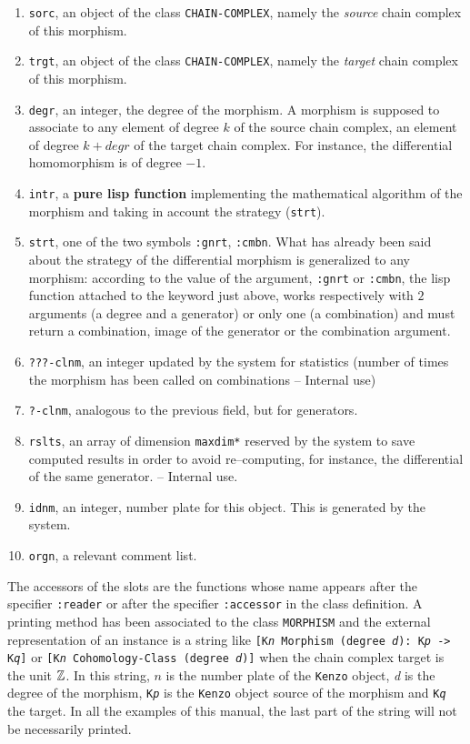 \begin{enumerate}
\item {\tt sorc}, an object of the class {\tt CHAIN-COMPLEX}, namely the {\em source} chain complex
of this morphism.
\item {\tt trgt}, an object of the class {\tt CHAIN-COMPLEX}, namely the {\em target} chain complex of this morphism.
\item {\tt degr}, an integer, the degree of the morphism. A morphism is supposed to associate
to any element of degree $k$ of the source chain complex, an element of degree $k + degr$ of the
target chain complex. For instance, the differential homomorphism is of degree $-1$.
\item {\tt intr}, a {\bf pure lisp function} implementing the mathematical algorithm of the morphism and
taking in account the strategy ({\tt strt}).
\item {\tt strt}, one of the two symbols {\tt :gnrt}, {\tt :cmbn}. What has already been  said about
the strategy of the differential morphism is generalized to any morphism: according 
to the value of the argument, {\tt :gnrt} or {\tt :cmbn}, the lisp function attached to the keyword just above, 
works respectively with $2$ arguments (a degree and a generator) or
only one (a combination) and must return a combination, image of the generator or the combination argument.
\item {\tt ???-clnm}, an integer updated by the system for statistics (number of times the
morphism has been called on combinations -- Internal use)
\item {\tt ?-clnm}, analogous to the previous field, but for generators.
\item {\tt rslts}, an array of dimension {\tt *maxdim*} reserved by the system to save  computed
results in order to avoid  re--computing, for instance, the differential of the same
generator. -- Internal use.
\item {\tt idnm}, an integer, number plate for this object. This is generated by
the system.
\item {\tt orgn}, a relevant comment list.
\end{enumerate}
The accessors of the slots are the functions whose name appears after the specifier {\tt :reader}
or after the specifier {\tt :accessor} in the class definition.
A printing method has been associated to the class {\tt MORPHISM} 
and the external representation of  an instance is a string like 
{\tt [K{\em n} Morphism (degree {\em d}): K{\em p} -> K{\em q}]}
or {\tt [K{\em n} Cohomology-Class (degree {\em d})]} 
when the chain complex target is the unit ${{\Bbb Z}}$. In this
string,  $n$ is the number plate of the {\tt Kenzo} object, {\em d} is the degree of the morphism, 
{\tt K{\em p}} is the {\tt Kenzo} object source of the morphism and {\tt K{\em q}} the target.
In all the  examples of this manual, the last part of the string will not be necessarily printed.

